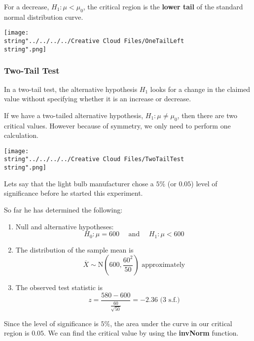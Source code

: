 \documentclass[11pt,a4paper]{book}
\begin{document}
\begin{minipage}[t]{.5\textwidth}

For a decrease, $H_{1}:\mu<\mu_{0}$, the critical region is the \textbf{lower
tail} of the standard normal distribution curve.

\end{minipage}
\begin{minipage}[t]{.5\textwidth}
\begin{center}
\texttt{[image: \\string"../../../../Creative Cloud Files/OneTailLeft\\string".png]}
\par\end{center}

\end{minipage}

\subsubsection*{Two-Tail Test}

In a two-tail test, the alternative hypothesis $H_{1}$ looks for
a change in the claimed value without specifying whether it is an
increase or decrease.

If we have a two-tailed alternative hypothesis, $H_{1}:\mu\neq\mu_{0}$,
then there are two critical values. However because of symmetry, we
only need to perform one calculation.
\begin{center}
\texttt{[image: \\string"../../../../Creative Cloud Files/TwoTailTest\\string".png]}
\par\end{center}

\newpage

Lets say that the light bulb manufacturer chose a $5\%$ (or $0.05$)
level of significance before he started this experiment.

So far he has determined the following:
\begin{enumerate}
\item Null and alternative hypotheses:
\[
H_{0}:\mu=600\quad\text{ and }\quad H_{1}:\mu<600
\]
\item The distribution of the sample mean is
\[
\overline{X}\sim\text{N}\left(600,\frac{60^{2}}{50}\right)\text{ approximately}
\]
\item The observed test statistic is
\[
{\displaystyle z=\frac{580-600}{\frac{60}{\sqrt{50}}}}=-2.36\text{ (3 s.f.)}
\]
\end{enumerate}
Since the level of significance is $5\%$, the area under the curve
in our critical region is $0.05$. We can find the critical value
by using the \textbf{invNorm} function.
\end{document}
